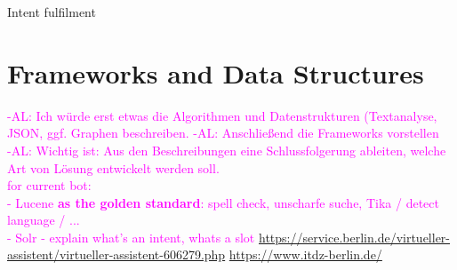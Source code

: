 %



Intent fulfilment \label{intent_fulfilment}

 







\section{Frameworks and Data Structures}\label{frameworks_structs}


\textcolor{magenta}{-AL: Ich w\"urde erst etwas die Algorithmen und Datenstrukturen (Textanalyse, JSON, ggf. Graphen beschreiben. 
	-AL: Anschlie{\ss}end die Frameworks vorstellen\\ 
	-AL: Wichtig ist: Aus den Beschreibungen eine Schlussfolgerung ableiten, welche Art von L\"osung entwickelt werden soll.\\
for current bot: \\
- Lucene \textbf{as the golden standard}: spell check, unscharfe suche, Tika / detect language / ... \\
- Solr
- explain what's an intent, whats a slot
\url{https://service.berlin.de/virtueller-assistent/virtueller-assistent-606279.php}
\url{https://www.itdz-berlin.de/}
}




